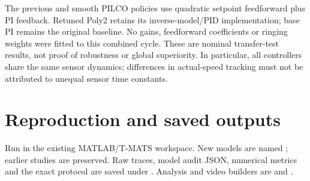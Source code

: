 \documentclass[11pt,a4paper]{article}
\begin{document}
The previous and smooth PILCO policies use quadratic setpoint feedforward plus PI feedback. Retuned Poly2 retains its inverse-model/PID implementation; base PI remains the original baseline. No gains, feedforward coefficients or ringing weights were fitted to this combined cycle. These are nominal transfer-test results, not proof of robustness or global superiority. In particular, all controllers share the same sensor dynamics; differences in actual-speed tracking must not be attributed to unequal sensor time constants.
\section{Reproduction and saved outputs}
Run  in the existing MATLAB/T-MATS workspace. New models are named ; earlier studies are preserved. Raw traces, model audit JSON, numerical metrics and the exact protocol are saved under . Analysis and video builders are  and .
\end{document}
